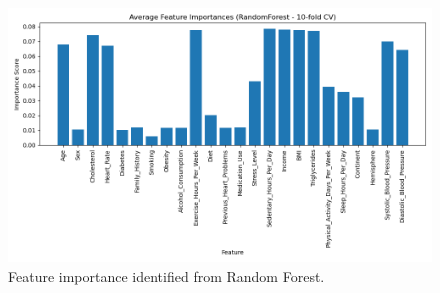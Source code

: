 \documentclass{article}
\begin{document}
\begin{figure}
\centering
\includegraphics[width=1\linewidth]{figures/average_feature_importances_(randomforest_-_10-fold_cv).png}
\caption{\label{fig:FI_RF} Feature importance identified from Random Forest.}
\end{figure}
\end{document}

